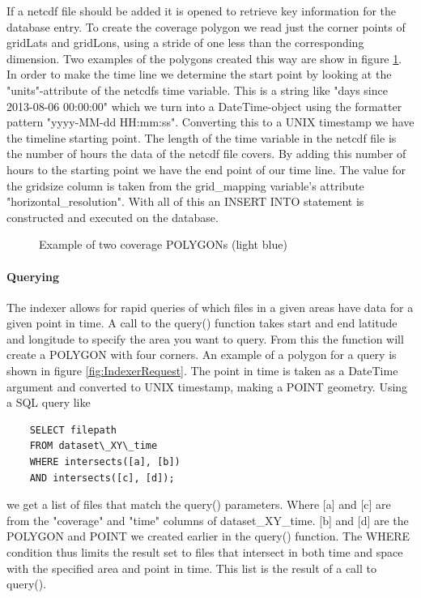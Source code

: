 \documentclass[11pt,a4paper,titlepage,oneside]{report}
\begin{document}
If a \gls{netcdf} file should be added it is opened to retrieve key information for the database entry. To create the coverage polygon we read just the corner points of gridLats and gridLons, using a stride of one less than the corresponding dimension. Two examples of the polygons created this way are show in figure \ref{fig:IndexerDatasets}. In order to make the time line we determine the start point by looking at the "units"-attribute of the \gls{netcdf}s time variable. This is a string like "days since 2013-08-06 00:00:00" which we turn into a DateTime-object using the formatter pattern "yyyy-MM-dd HH:mm:ss". Converting this to a UNIX timestamp we have the timeline starting point. The length of the time variable in the \gls{netcdf} file is the number of hours the data of the \gls{netcdf} file covers. By adding this number of hours to the starting point we have the end point of our time line. The value for the gridsize column is taken from the grid\_mapping variable’s attribute "horizontal\_resolution". With all of this an INSERT INTO statement is constructed and executed on the database.

\begin{figure}[!htb]
\begin{center}
\caption{Example of two coverage POLYGONs (light blue)}
\label{fig:IndexerDatasets}
\end{center}
\end{figure}

\paragraph{Querying}
The indexer allows for rapid queries of which files in a given areas have data for a given point in time. A call to the query() function takes start and end latitude and longitude to specify the area you want to query. From this the function will create a POLYGON with four corners. An example of a polygon for a query is shown in figure \ref{fig:IndexerRequest}. The point in time is taken as a DateTime argument and converted to UNIX timestamp, making a POINT geometry. Using a SQL query like 
\begin{lstlisting}
    SELECT filepath
    FROM dataset\_XY\_time
    WHERE intersects([a], [b])
    AND intersects([c], [d]);
\end{lstlisting}
we get a list of files that match the query() parameters. Where [a] and [c] are from the "coverage" and "time" columns of dataset\_XY\_time. [b] and [d] are the POLYGON and POINT we created earlier in the query() function. The WHERE condition thus limits the result set to files that intersect in both time and space with the specified area and point in time. This list is the result of a call to query().
\end{document}

